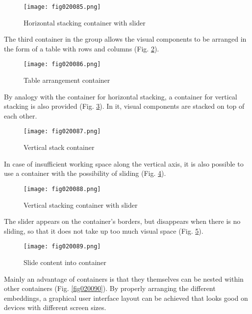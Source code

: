 \begin{figure}[H]
   \centering
   \texttt{[image: fig020085.png]}
   \caption{Horizontal stacking container with slider}
\label{fig020085}
\end{figure}

The third container in the group allows the visual components to be arranged in the form of a table with rows and columns (Fig. \ref{fig020086}).

\begin{figure}[H]
   \centering
   \texttt{[image: fig020086.png]}
   \caption{Table arrangement container}
\label{fig020086}
\end{figure}

By analogy with the container for horizontal stacking, a container for vertical stacking is also provided (Fig. \ref{fig020087}). In it, visual components are stacked on top of each other.

\begin{figure}[H]
   \centering
   \texttt{[image: fig020087.png]}
   \caption{Vertical stack container}
\label{fig020087}
\end{figure}

In case of insufficient working space along the vertical axis, it is also possible to use a container with the possibility of sliding (Fig. \ref{fig020088}).

\begin{figure}[H]
   \centering
   \texttt{[image: fig020088.png]}
   \caption{Vertical stacking container with slider}
\label{fig020088}
\end{figure}

The slider appears on the container's borders, but disappears when there is no sliding, so that it does not take up too much visual space (Fig. \ref{fig020089}).

\begin{figure}[H]
   \centering
   \texttt{[image: fig020089.png]}
   \caption{Slide content into container}
\label{fig020089}
\end{figure}

Mainly an advantage of containers is that they themselves can be nested within other containers (Fig. \ref{fig020090}). By properly arranging the different embeddings, a graphical user interface layout can be achieved that looks good on devices with different screen sizes.

